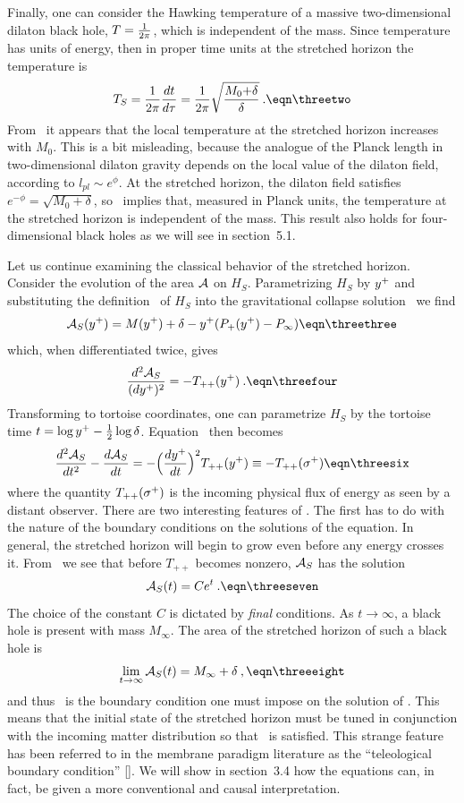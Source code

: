Finally, one can consider the Hawking temperature of a massive
two-dimensional dilaton black hole, $T = {1\over 2\pi}$, which is
independent of the mass.  Since temperature has units of energy, then
in proper time units at the stretched horizon the temperature is
$$
T_S = {1 \over 2\pi} {dt \over d\tau}
= {1 \over 2\pi} \sqrt{M_0{+}\delta \over \delta} \>.
\eqn\threetwo
$$
{}From \threetwo\ it appears that the local temperature at the
stretched horizon increases with $M_0$.  This is a bit misleading,
because the analogue of the Planck length in two-dimensional dilaton
gravity depends on the local value of the dilaton field, according to
$l_{pl} \sim e^\phi$.  At the stretched horizon, the dilaton field
satisfies $e^{-\phi}=\sqrt{M_0{+}\delta}$, so \threetwo\ implies
that, measured in Planck units, the temperature at the stretched
horizon is independent of the mass.  This result also holds for
four-dimensional black holes as we will see in section~5.1.

Let us continue examining the classical behavior of the stretched
horizon.  Consider the evolution of the area ${\cal A}$ on $H_S$.
Parametrizing $H_S$ by $\yp$ and substituting the definition \hsone\
of $H_S$ into the gravitational collapse solution \imone\ we find
$$
{\cal A}_S(\yp) = M(\yp) + \delta - \yp (P_+(\yp) - P_{\infty})
\eqn\threethree
$$
which, when differentiated twice, gives
$$
{d^2 {\cal A}_S \over (d\yp)^2} = -T_{++}(\yp) \>.
\eqn\threefour
$$
Transforming to tortoise coordinates, one can parametrize $H_S$ by
the tortoise time $t = \log\yp - \half \log\delta$.  Equation
\threefour\ then becomes
$$
{d^2 {\cal A}_S \over dt^2} - {d{\cal A}_S \over dt} = -\Bigl( {d\yp
\over dt} \Bigr)^2 T_{++}(\yp) \equiv -T_{++}(\sp)
\eqn\threesix
$$
where the quantity $T_{++}(\sp)$ is the incoming physical flux of
energy as seen by a distant observer.  There are two interesting
features of \threesix .  The first has to do with the nature of the
boundary conditions on the solutions of the equation.  In general,
the stretched horizon will begin to grow even before any energy
crosses it.  From \threesix\ we see that before $T_{++}$ becomes
nonzero, ${\cal A}_S$ has the solution
$$
{\cal A}_S(t) = Ce^t  \>.
\eqn\threeseven
$$
The choice of the constant $C$ is dictated by {\it final} conditions.
 As $t \rightarrow \infty$, a black hole is present with mass
$M_\infty$.  The area of the stretched horizon of such a black hole
is
$$
\lim_{t \to \infty} {\cal A}_S(t) = M_\infty + \delta \>,
\eqn\threeeight
$$
and thus \threeeight\ is the boundary condition one must impose on
the solution of \threesix .  This means that the initial state of the
stretched horizon must be tuned in conjunction with the incoming
matter distribution so that \threeeight\ is satisfied.  This strange
feature has been referred to in the membrane paradigm literature as
the ``teleological boundary condition'' [\Mempar].  We will show in
section~3.4 how the equations can, in fact, be given a more
conventional and causal interpretation.


